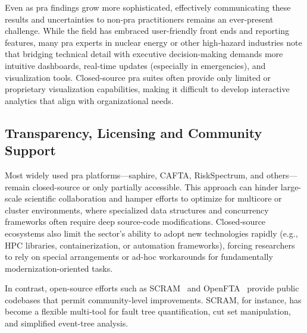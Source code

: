 Even as \acrshort{pra} findings grow more sophisticated, effectively communicating these results and uncertainties to non-\acrshort{pra} practitioners remains an ever-present challenge. While the field has embraced user-friendly front ends and reporting features, many \acrshort{pra} experts in nuclear energy or other high-hazard industries note that bridging technical detail with executive decision-making demands more intuitive dashboards, real-time updates (especially in emergencies), and visualization tools. Closed-source \acrshort{pra} suites often provide only limited or proprietary visualization capabilities, making it difficult to develop interactive analytics that align with organizational needs.

\subsection*{Transparency, Licensing and Community Support}

Most widely used \acrshort{pra} platforms—\acrshort{saphire}, CAFTA, RiskSpectrum, and others—remain closed-source or only partially accessible. This approach can hinder large-scale scientific collaboration and hamper efforts to optimize for multicore or cluster environments, where specialized data structures and concurrency frameworks often require deep source-code modifications. Closed‐source ecosystems also limit the sector’s ability to adopt new technologies rapidly (e.g., HPC libraries, containerization, or automation frameworks), forcing researchers to rely on special arrangements or ad-hoc workarounds for fundamentally modernization-oriented tasks.

In contrast, open-source efforts such as SCRAM~\cite{scram} and OpenFTA~\cite{opensource_fta_tools} provide public codebases that permit community-level improvements. SCRAM, for instance, has become a flexible multi-tool for fault tree quantification, cut set manipulation, and simplified event-tree analysis.

